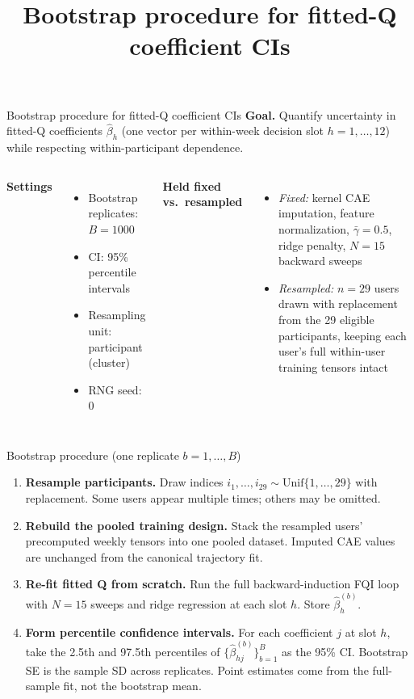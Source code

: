 \documentclass[aspectratio=169]{beamer}
\title{Bootstrap procedure for fitted-Q coefficient CIs}
\author{}
\date{}
\begin{document}
\begin{frame}{Bootstrap procedure for fitted-Q coefficient CIs}
  \textbf{Goal.}
  Quantify uncertainty in fitted-Q coefficients $\widehat{\beta}_h$
  (one vector per within-week decision slot $h=1,\ldots,12$) while respecting
  within-participant dependence.

  \vspace{0.4em}
  \begin{columns}[T,onlytextwidth]
    \textbf{Settings}
    \begin{itemize}
      \item Bootstrap replicates: $B = 1000$
      \item CI: 95\% percentile intervals
      \item Resampling unit: participant (cluster)
      \item RNG seed: $0$
    \end{itemize}

    \textbf{Held fixed vs.\ resampled}
    \begin{itemize}
      \item \emph{Fixed:} kernel CAE imputation, feature normalization,
        $\bar\gamma = 0.5$, ridge penalty, $N=15$ backward sweeps
      \item \emph{Resampled:} $n=29$ users drawn with replacement from the
        29 eligible participants, keeping each user's full within-user
        training tensors intact
    \end{itemize}
  \end{columns}
\end{frame}

\begin{frame}{Bootstrap procedure (one replicate $b=1,\ldots,B$)}
  \begin{enumerate}
    \item \textbf{Resample participants.}
      Draw indices $i_1,\ldots,i_{29} \sim \mathrm{Unif}\{1,\ldots,29\}$
      with replacement. Some users appear multiple times; others may be omitted.

    \item \textbf{Rebuild the pooled training design.}
      Stack the resampled users' precomputed weekly tensors into one pooled
      dataset. Imputed CAE values are unchanged from the canonical trajectory fit.

    \item \textbf{Re-fit fitted Q from scratch.}
      Run the full backward-induction FQI loop with $N=15$ sweeps and ridge
      regression at each slot $h$. Store $\widehat{\beta}_h^{(b)}$.

    \item \textbf{Form percentile confidence intervals.}
      For each coefficient $j$ at slot $h$, take the 2.5th and 97.5th
      percentiles of $\{\widehat{\beta}_{hj}^{(b)}\}_{b=1}^B$ as the 95\% CI.
      Bootstrap SE is the sample SD across replicates.
      Point estimates come from the full-sample fit, not the bootstrap mean.
  \end{enumerate}
\end{frame}
\end{document}
